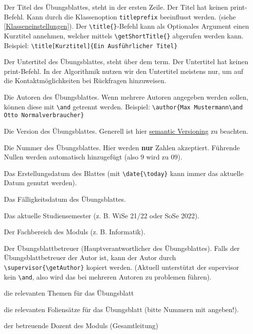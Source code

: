 \documentclass[
    titleprefix=AlgoTeX,
    inlineshortcut=java,
    corporatedesign,
    boxarc,
]{algoexercise}
\renewcommand*{\author}[1]{
    \seq_gset_split:Nnn \g_ptxcd_author_seq {\and} {#1}
    \seq_if_empty:NF \g_ptxcd_author_seq {\tl_gset:Nn \printAuthor {\int_compare:nTF{\seq_count:N \g_ptxcd_author_seq >
                1}{Autoren}{Autor}:~\hfill\seq_use:Nnnn \g_ptxcd_author_seq {~\authorandname{}~} {,~} {~\authorandname{}~}\par}}
}
\begin{document}
    \begin{description}[leftmargin=2.5cm]
        \item[title] \sloppy{}Der Titel
            des Übungsblattes, steht in der ersten Zeile.
            Der Titel hat keinen print-Befehl.
            Kann durch die Klassenoption \verb+titleprefix+ beeinflusst werden.
            (siehe \ref{Klasseneinstellungen}).
            Der \verb+\title{}+-Befehl kann als Optionales Argument einen Kurztitel annehmen, welcher mittels \verb+\getShortTitle{}+
            abgerufen werden kann.
            Beispiel: \verb+\title[Kurztitel]{Ein Ausführlicher Titel}+
        \item[subtitle] Der Untertitel des Übungsblattes, steht über dem
            term.
            Der Untertitel hat keinen print-Befehl.
            In der Algorithmik nutzen wir den Untertitel meistens nur, um auf die Kontaktmöglichkeiten bei Rückfragen hinzuweisen.
        \item[author] Die Autoren des Übungsblattes.
            Wenn mehrere Autoren angegeben werden sollen, können diese mit \verb+\and+ getrennt werden.
            Beispiel: \verb+\author{Max Mustermann\and Otto Normalverbraucher}+
        \item[version] Die Version des Übungsblattes.
            Generell ist hier \href{https://semver.org/lang/de/}{semantic Versioning} zu beachten.
        \item[sheetnumber] Die Nummer des Übungsblattes.
            Hier werden \textbf{nur} Zahlen akzeptiert.
            Führende Nullen werden automatisch hinzugefügt (also $9$ wird zu $09$).
        \item[date] Das Erstellungsdatum des Blattes (mit \verb+\date{\today}+ kann immer das aktuelle Datum genutzt werden).
        \item[duedate] Das Fälligkeitsdatum des Übungsblattes.
        \item[semester] Das aktuelle Studiensemester (z.
            B.
            WiSe 21/22 oder SoSe 2022).
        \item[fachbereich] Der Fachbereich des Moduls (z.
            B.
            Informatik).
        \item[supervisor] Der Übungsblattbetreuer (Hauptverantwortlicher des Übungsblattes).
            Falls der Übungsblattbetreuer der Autor ist, kann der Autor durch \verb+\supervisor{\getAuthor}+ kopiert werden.
            (Aktuell unterstützt der supervisor kein \verb+\and+,
            also wird das bei mehreren Autoren zu problemen führen).
        \item[topics] die relevanten Themen für das Übungsblatt
        \item[slides] die relevanten Foliensätze für das Übungsblatt (bitte Nummern mit angeben!).
        \item[dozent] der betreuende Dozent des Moduls (Gesamtleitung)
    \end{description}
    \clearpage
\end{document}
